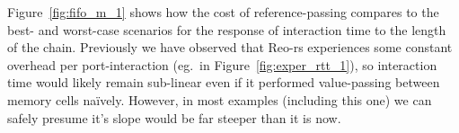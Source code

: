 Figure~\ref{fig:fifo_m_1} shows how the cost of reference-passing compares to the best- and worst-case scenarios for the response of interaction time to the length of the chain. Previously we have observed that Reo-rs experiences some constant overhead per port-interaction (eg.\ in Figure~\ref{fig:exper_rtt_1}), so interaction time would likely remain sub-linear even if it performed value-passing between memory cells na\"ively. However, in most examples (including this one) we can safely presume it's slope would be far steeper than it is now.

\begin{figure}
	\centering
\end{figure}
